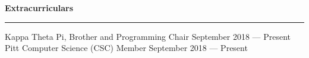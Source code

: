 \documentclass[11pt]{article}
\begin{document}
\begin{flushleft}
		\vspace{1.75mm}
		{\large \raggedright \textbf{Extracurriculars}}
		\vspace{1.5mm}
	
		\hrule
	
		\vspace{2.5mm}
		Kappa Theta Pi, Brother and Programming Chair \hfill September 2018 --- Present\\
		Pitt Computer Science (CSC) Member \hfill September 2018 --- Present
	\end{flushleft}
\end{document}
